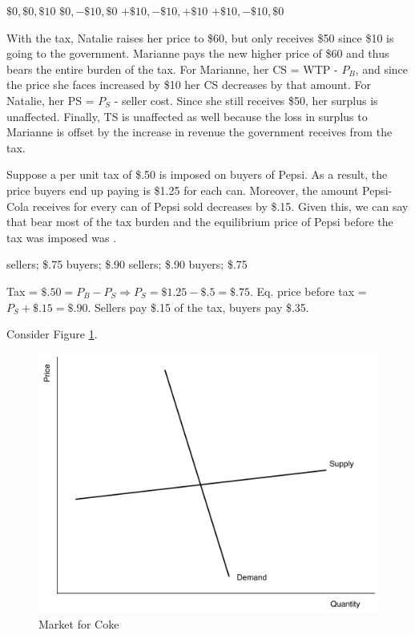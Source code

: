 \documentclass[addpoints,11pt]{exam}
\theoremstyle{definition}
\newcommand{\blank}[0]{\underline{\hspace{3cm}}}
\begin{document}
\begin{questions}
	\begin{choices}
		\choice $\$0, \$0, \$10$
		\CorrectChoice $\$0, -\$10, \$0$
		\choice $+\$10, -\$10, +\$10$
		\choice $+\$10, -\$10, \$0$
	\end{choices}
	
	\begin{solution}
		With the tax, Natalie raises her price to \$60, but only receives \$50 since \$10 is going to the government. Marianne pays the new higher price of \$60 and thus bears the entire burden of the tax. For Marianne, her CS = WTP - $P_B$, and since the price she faces increased by \$10 her CS decreases by that amount. For Natalie, her PS = $P_S$ - seller cost. Since she still receives \$50, her surplus is unaffected. Finally, TS is unaffected as well because the loss in surplus to Marianne is offset by the increase in revenue the government receives from the tax.
	\end{solution}
	
		\question Suppose a per unit tax of \$.50 is imposed on buyers of Pepsi. As a result, the price buyers end up paying is \$1.25 for each can. Moreover, the amount Pepsi-Cola receives for every can of Pepsi sold decreases by \$.15. Given this, we can say that \blank bear most of the tax burden and the equilibrium price of Pepsi before the tax was imposed was \blank.
		
		\begin{choices}
			\choice sellers; \$.75
			\CorrectChoice buyers; \$.90
			\choice sellers; \$.90
			\choice buyers; \$.75
		\end{choices}
	
	\begin{solution}
		Tax = $\$.50 = P_B - P_S \Rightarrow P_S = \$1.25-\$.5 = \$.75.$ Eq. price before tax = $P_S + \$.15 = \$.90$. Sellers pay \$.15 of the tax, buyers pay \$.35.
	\end{solution}
	
	
	\question Consider Figure \ref{fig1}. 
	
	\begin{figure}[H]
		\centering
		\includegraphics[scale=.45]{Exam1_MC19.pdf}
		\caption{Market for Coke}
		\label{fig1}
	\end{figure}
	

\end{questions}
\end{document}
